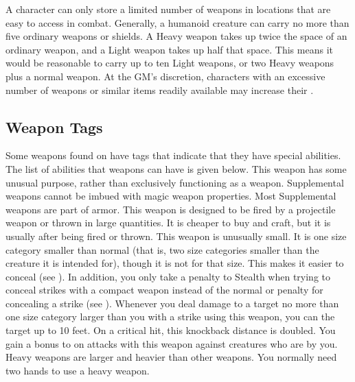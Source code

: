         A character can only store a limited number of weapons in locations that are easy to access in combat.
        Generally, a humanoid creature can carry no more than five ordinary weapons or shields.
        A Heavy weapon takes up twice the space of an ordinary weapon, and a Light weapon takes up half that space.
        This means it would be reasonable to carry up to ten Light weapons, or two Heavy weapons plus a normal weapon.
        At the GM's discretion, characters with an excessive number of weapons or similar items readily available may increase their .

    \subsection{Weapon Tags}\label{Weapon Tags}
        Some weapons found on  have tags that indicate that they have special abilities. The list of abilities that weapons can have is given below.
         This weapon has some unusual purpose, rather than exclusively functioning as a weapon.
        Supplemental weapons cannot be imbued with magic weapon properties.
        Most Supplemental weapons are part of armor.
         This weapon is designed to be fired by a projectile weapon or thrown in large quantities.
        It is cheaper to buy and craft, but it is usually  after being fired or thrown.
         This weapon is unusually small.
        It is one size category smaller than normal (that is, two size categories smaller than the creature it is intended for), though it is not  for that size.
        This makes it easier to conceal (see ).
        In addition, you only take a  penalty to Stealth when trying to conceal strikes with a compact weapon instead of the normal  or  penalty for concealing a strike (see ).
         Whenever you deal damage to a target no more than one size category larger than you with a strike using this weapon, you can  the target up to 10 feet.
        On a critical hit, this knockback distance is doubled.
         You gain a  bonus to  on  attacks with this weapon against creatures who are \grappled by you.
         Heavy weapons are larger and heavier than other weapons.
        You normally need two hands to use a heavy weapon.
